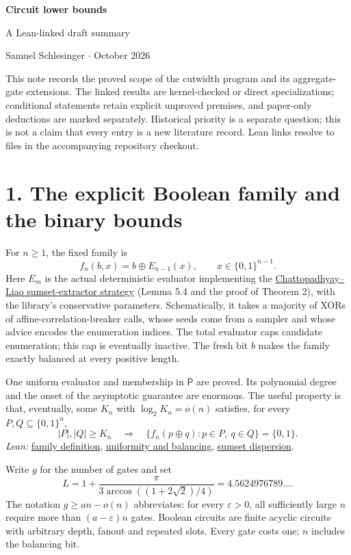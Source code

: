 \documentclass[11pt]{article}
\providecommand{\RepoRoot}{../../}
\newcommand{\repolink}[2]{\href{\RepoRoot#1}{#2}}
\newcommand{\leanlink}[2]{\repolink{Complexitylib/Algebraic/LowerBound/Cutwidth/#1}{#2}}
\newcommand{\little}[1]{o(#1)}
\begin{document}
\begin{center}
  {\Large\bfseries Circuit lower bounds}\par\vspace{3pt}
  {\large A Lean-linked draft summary}\par\vspace{4pt}
  {\small Samuel Schlesinger \quad $\cdot$  October 2026}
\end{center}

This note records the proved scope of the cutwidth program and its aggregate-gate
extensions. The linked results are kernel-checked or direct specializations;
conditional statements retain explicit unproved premises, and paper-only deductions
are marked separately. Historical priority is a separate question; this is not a
claim that every entry is a new literature record. Lean links resolve to files
in the accompanying repository checkout.

\section*{1. The explicit Boolean family and the binary bounds}

For $n\geq1$, the fixed family is
\[
  f_n(b,x)=b\oplus E_{n-1}(x),\qquad x\in\{0,1\}^{n-1}.
\]
Here $E_m$ is the actual deterministic evaluator implementing the
\href{https://arxiv.org/abs/2110.12652}{Chattopadhyay--Liao sumset-extractor strategy}
(Lemma 5.4 and the proof of Theorem 2), with the library's conservative parameters.
Schematically, it takes a majority of XORs of affine-correlation-breaker calls,
whose seeds come from a sampler and whose advice encodes the enumeration indices.
The total evaluator caps candidate enumeration; this cap is eventually inactive.
The fresh bit $b$ makes the family exactly balanced at every positive length.

One uniform evaluator and membership in $\mathsf P$ are proved. Its polynomial
degree and the onset of the asymptotic guarantee are enormous. The useful
property is that, eventually, some $K_n$ with $\log_2K_n=\little n$ satisfies,
for every $P,Q\subseteq\{0,1\}^n$,
\[
  |P|,|Q|\geq K_n
  \quad\Longrightarrow\quad
  \{f_n(p\oplus q):p\in P,\ q\in Q\}=\{0,1\}.
\]
\textit{Lean:}
\leanlink{Extractor/SourceReduction/Construction/Uniform/Defs.lean}{family definition},
\leanlink{Extractor/SourceReduction/Construction/Uniform.lean}{uniformity and balancing},
\leanlink{Aggregate/Capacity/Polarity.lean}{sumset dispersion}.

Write $g$ for the number of gates and set
\[
 L=1+\frac{\pi}{3\arccos((1+2\sqrt2)/4)}=4.5624976789\ldots.
\]
The notation $g\geq an-\little n$ abbreviates: for every $\varepsilon>0$,
all sufficiently large $n$ require more than $(a-\varepsilon)n$ gates.
Boolean circuits are finite acyclic circuits with arbitrary depth, fanout and
repeated slots. Every gate costs one; $n$ includes the balancing bit.
\end{document}
